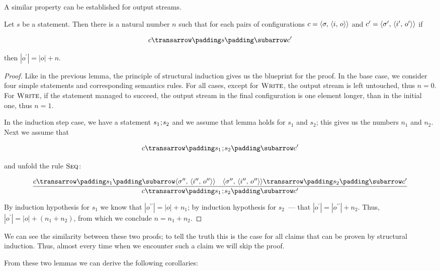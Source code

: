 A similar property can be established for output streams.

\begin{lemma} Let $s$ be a statement. Then there is a natural number $n$ such that for each
pairs of configurations $c=\left<{\sigma,\,\left<{i,\,o}\right>}\right>$ and $c^\prime=\left<{\sigma^\prime,\,\left<{i^\prime,\,o^\prime}\right>}\right>$ if

\[
\trans{c}{s}{c^\prime}
\]

then $|o^\prime|=|o|+n$.
\end{lemma}

\begin{proof}
  Like in the previous lemma, the principle of structural induction gives us the blueprint for the proof.
  In the base case, we consider four simple statements and corresponding semantics rules. For all cases, except for
  $\textsc{Write}$, the output stream is left untouched, thus $n=0$. For $\textsc{Write}$, if the statement
  managed to succeed, the output stream in the final configuration is one element longer, than in the initial
  one, thus $n=1$.

  In the induction step case, we have a statement $s_1\llang{;}s_2$ and we assume that lemma holds for $s_1$ and $s_2$; this
  gives us the numbers $n_1$ and $n_2$. Next we assume that

  \[
  \trans{c}{s_1\llang{;}s_2}{c^\prime}
  \]

  and unfold the rule $\textsc{Seq}$:

  \[
  \trule{\trans{c}{s_1}{\inbr{\sigma^{\prime\prime},\,\inbr{i^{\prime\prime},\,o^{\prime\prime}}}}\quad\trans{\inbr{\sigma^{\prime\prime},\,\inbr{i^{\prime\prime},\,o^{\prime\prime}}}}{s_2}{c^\prime}}
        {\trans{c}{s_1\llang{;}s_2}{c^\prime}}
  \]


  By induction hypothesis for $s_1$ we know that $|o^{\prime\prime}|=|o|+n_1$; by induction hypothesis for $s_2$~--- that $|o^\prime|=|o^{\prime\prime}|+n_2$. Thus, $|o^\prime|=|o|+(n_1+n_2)$, from
  which we conclude $n=n_1+n_2$.
\end{proof}

We can see the similarity between these two proofs; to tell the truth this is the case for all claims that can be proven by structural induction. Thus, almost every time
when we encounter such a claim we will skip the proof.

From these two lemmas we can derive the following corollaries:

